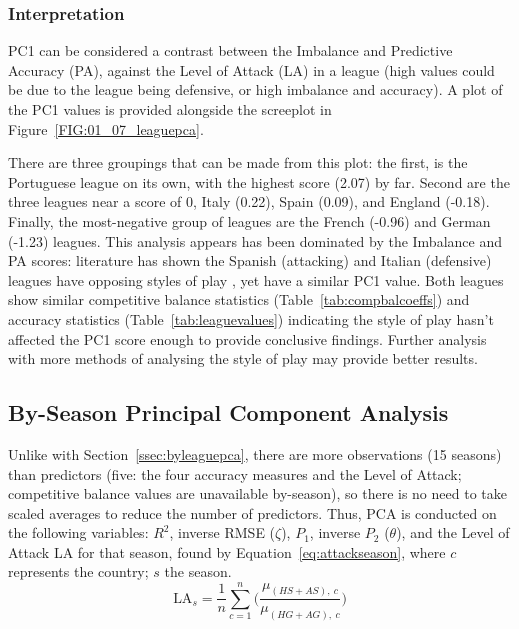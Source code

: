 \documentclass[a4paper,10pt]{report}
\begin{document}
\subsubsection{Interpretation}
PC1 can be considered a contrast between the Imbalance and Predictive Accuracy (PA), against the Level of Attack (LA) in a league (high values could be due to the league being defensive, or high imbalance and accuracy). A plot of the PC1 values is provided alongside the screeplot in Figure~\ref{FIG:01_07_leaguepca}.\vspace{3mm}

There are three groupings that can be made from this plot: the first, is the Portuguese league on its own, with the highest score (2.07) by far. Second are the three leagues near a score of 0, Italy (0.22), Spain (0.09), and England (-0.18). Finally, the most-negative group of leagues are the French (-0.96) and German (-1.23) leagues. This analysis appears has been dominated by the Imbalance and PA scores: literature has shown the Spanish (attacking) and Italian (defensive) leagues have opposing styles of play \autocite{bosca09}, yet have a similar PC1 value. Both leagues show similar competitive balance statistics (Table~\ref{tab:compbalcoeffs}) and accuracy statistics (Table~\ref{tab:leaguevalues}) indicating the style of play hasn't affected the PC1 score enough to provide conclusive findings. Further analysis with more methods of analysing the style of play may provide better results.

\pagebreak
\subsection{By-Season Principal Component Analysis}\label{ssec:byseasonpca}
Unlike with Section~\ref{ssec:byleaguepca}, there are more observations (15 seasons) than predictors (five: the four accuracy measures and the Level of Attack; competitive balance values are unavailable by-season), so there is no need to take scaled averages to reduce the number of predictors. Thus, PCA is conducted on the following variables: $R^2$, inverse RMSE ($\zeta$), $P_1$, inverse $P_2$ ($\theta$), and the Level of Attack LA for that season, found by Equation~\ref{eq:attackseason}, where $c$ represents the country; $s$ the season. 
\begin{equation}
\textrm{LA}_s = 
\frac{1}{n}\sum^{n}_{c=1} \bigg(\frac{\mu_{(HS+AS),\ c}}{\mu_{(HG+AG),\ c}} \bigg)\label{eq:attackseason}
\end{equation}
\end{document}
